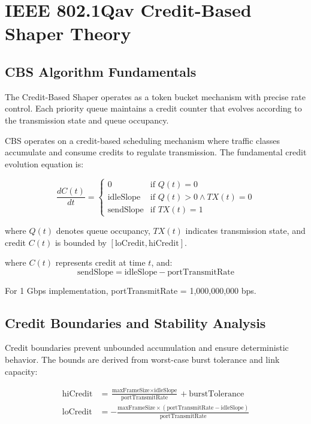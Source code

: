\documentclass[10pt, journal, compsoc]{IEEEtran}
\begin{document}
\section{IEEE 802.1Qav Credit-Based Shaper Theory}

\subsection{CBS Algorithm Fundamentals}

The Credit-Based Shaper operates as a token bucket mechanism with precise rate control. Each priority queue maintains a credit counter that evolves according to the transmission state and queue occupancy.

CBS operates on a credit-based scheduling mechanism where traffic classes accumulate and consume credits to regulate transmission. The fundamental credit evolution equation is:

\begin{equation}
\frac{dC(t)}{dt} = \begin{cases}
0 & \text{if } Q(t) = 0 \\
\text{idleSlope} & \text{if } Q(t) > 0 \land TX(t) = 0 \\
\text{sendSlope} & \text{if } TX(t) = 1
\end{cases}
\end{equation}

where $Q(t)$ denotes queue occupancy, $TX(t)$ indicates transmission state, and credit $C(t)$ is bounded by $[\text{loCredit}, \text{hiCredit}]$.

where $C(t)$ represents credit at time $t$, and:
\begin{equation}
\text{sendSlope} = \text{idleSlope} - \text{portTransmitRate}
\end{equation}

For 1 Gbps implementation, portTransmitRate = 1,000,000,000 bps.

\subsection{Credit Boundaries and Stability Analysis}

Credit boundaries prevent unbounded accumulation and ensure deterministic behavior. The bounds are derived from worst-case burst tolerance and link capacity:

\begin{align}
\text{hiCredit} &= \frac{\text{maxFrameSize} \times \text{idleSlope}}{\text{portTransmitRate}} + \text{burstTolerance} \\
\text{loCredit} &= -\frac{\text{maxFrameSize} \times (\text{portTransmitRate} - \text{idleSlope})}{\text{portTransmitRate}}
\end{align}
\end{document}

